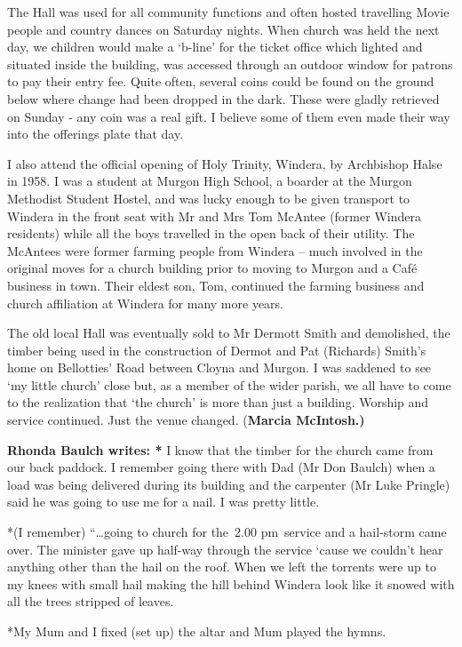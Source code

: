 The Hall was used for all community functions and often hosted travelling Movie people and country dances on Saturday nights. When church was held the next day, we children would make a `b-line' for the ticket office which lighted and situated inside the building, was accessed through an outdoor window for patrons to pay their entry fee. Quite often, several coins could be found on the ground below where change had been dropped in the dark. These were gladly retrieved on Sunday - any coin was a real gift. I believe some of them even made their way into the offerings plate that day.

I also attend the official opening of Holy Trinity, Windera, by Archbishop Halse in 1958. I was a student at Murgon High School, a boarder at the Murgon Methodist Student Hostel, and was lucky enough to be given transport to Windera in the front seat with Mr and Mrs Tom McAntee (former Windera residents) while all the boys travelled in the open back of their utility. The McAntees were former farming people from Windera -- much involved in the original moves for a church building prior to moving to Murgon and a Café business in town. Their eldest son, Tom, continued the farming business and church affiliation at Windera for many more years.

The old local Hall was eventually sold to Mr Dermott Smith and demolished, the timber being used in the construction of Dermot and Pat (Richards) Smith's home on Bellotties' Road between Cloyna and Murgon. I was saddened to see `my little church' close but, as a member of the wider parish, we all have to come to the realization that `the church' is more than just a building. Worship and service continued. Just the venue changed. (\textbf{Marcia McIntosh.)}

\textbf{Rhonda Baulch writes: *} I know that the timber for the church came from our back paddock. I remember going there with Dad (Mr Don Baulch) when a load was being delivered during its building and the carpenter (Mr Luke Pringle) said he was going to use me for a nail. I was pretty little.

*(I remember) ``\ldots going to church for the~2.00 pm~service and a hail-storm came over. The minister gave up half-way through the service `cause we couldn't hear anything other than the hail on the roof. When we left the torrents were up to my knees with small hail making the hill behind Windera look like it snowed with all the trees stripped of leaves.

*My Mum and I fixed (set up) the altar and Mum played the hymns.


